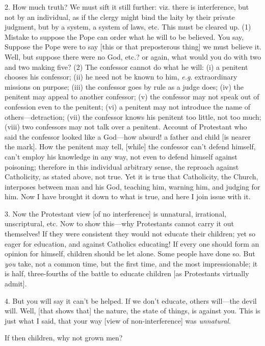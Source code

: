 2. How much truth? We must sift it still further:
viz. there is interference, but not by an individual, as if the clergy
might bind the laity by their private judgment, but by a system, a
system of laws, etc. This must be cleared up. (1) Mistake to suppose
the Pope can order what he will to be believed. You say, Suppose the
Pope were to say [this or that preposterous thing] we must believe it.
Well, but suppose there were no God, etc.? or again, what would you do
with two and two making five? (2) The confessor cannot do what he
will: (i) a penitent chooses his confessor; (ii) he need not be known to him, \emph{e.g}. extraordinary missions on purpose; (iii) the
confessor goes by rule as a judge does; (iv) the penitent may appeal
to another confessor; (v) the confessor may not speak out of
confession even to the penitent; (vi) a penitent may not introduce the
name of others—detraction; (vii) the confessor knows his penitent
too little, not too much; (viii) two confessors may not talk over a
penitent. Account of Protestant who said the confessor looked like a
God—how absurd! a father and child [is nearer the mark]. How the
penitent may tell, [while] the confessor can't defend himself, can't
employ his knowledge in any way, not even to defend himself against
poisoning; therefore in this individual arbitrary sense, the reproach
against Catholicity, as stated above, not true. Yet it is true that
Catholicity, the Church, interposes between man and his God, teaching
him, warning him, and judging for him. Now I have brought it down to
what is true, and here I join issue with it.

3. Now the Protestant view [of no interference]
is unnatural, irrational, unscriptural, etc. Now to show this—why
Protestants cannot carry it out themselves! If they were consistent
they would not educate their children; yet so eager for education, and
against Catholics educating! If every one should form an opinion for
himself, children should be let alone. Some people have done so. But \emph{you}
take, not a common time, but the first time, and the most
impressionable; it is half, three-fourths of the battle to educate
children [as Protestants virtually admit].

4. But you will say it can't be helped. If we
don't educate, others will—the devil will. Well, [that shows
that] the nature, the state of things, is against you. This is just
what I said, that your way [view of non-interference] was \emph{unnatural}.

If then children, why not grown men?

